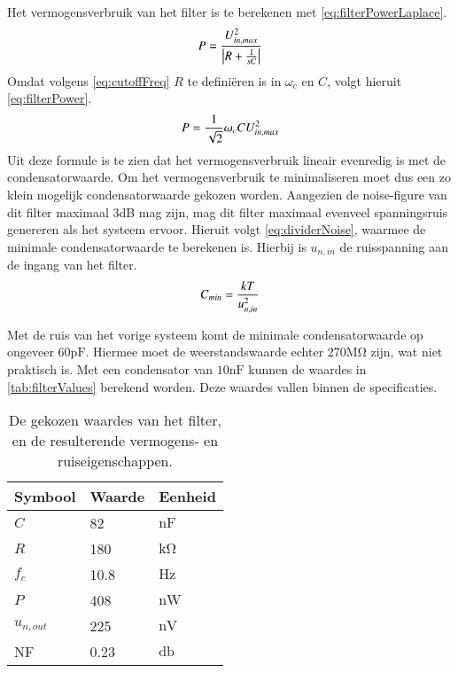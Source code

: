Het vermogensverbruik van het filter is te berekenen met \autoref{eq:filterPowerLaplace}.
\begin{equation} \label{eq:filterPowerLaplace}
    P = \frac{U_{in,max}^2}{\left|R + \frac{1}{sC}\right|}
    \tagaddtext{[\si{\watt}]}
\end{equation}
Omdat volgens \autoref{eq:cutoffFreq} $R$ te definiëren is in $\omega_c$ en $C$, volgt hieruit \autoref{eq:filterPower}.
\begin{equation} \label{eq:filterPower}
    P = \frac{1}{\sqrt{2}}\omega_cCU_{in,max}^2
    \tagaddtext{[\si{\watt}]}
\end{equation}
Uit deze formule is te zien dat het vermogensverbruik lineair evenredig is met de condensatorwaarde. Om het vermogensverbruik te minimaliseren moet dus een zo klein mogelijk condensatorwaarde gekozen worden. Aangezien de noise-figure van dit filter maximaal 3dB mag zijn, mag dit filter maximaal evenveel spanningsruis genereren als het systeem ervoor. Hieruit volgt \autoref{eq:dividerNoise}, waarmee de minimale condensatorwaarde te berekenen is. Hierbij is $u_{n,in}$ de ruisspanning aan de ingang van het filter.
\begin{equation} \label{eq:filterCapMin}
    C_{min} = \frac{kT}{u_{n,in}^2}
    \tagaddtext{[\si{\farad}]}
\end{equation}

Met de ruis van het vorige systeem komt de minimale condensatorwaarde op ongeveer $60\si{\pico\farad}$. Hiermee moet de weerstandswaarde echter $270\si{\mega\ohm}$ zijn, wat niet praktisch is. Met een condensator van $10\si{\nano\farad}$ kunnen de waardes in \autoref{tab:filterValues} berekend worden. Deze waardes vallen binnen de specificaties.

\begin{table}[ht]
    \centering
    \begin{tabular}{l|l|l}
        Symbool & Waarde & Eenheid \\
        \hline
        $C$         & 82    & $\si{\nano\farad}$\\
        $R$         & 180   & $\si{\kilo\ohm}$  \\
        $f_c$       & 10.8  & $\si{\hertz}$     \\
        $P$         & 408   & $\si{\nano\watt}$ \\
        $u_{n,out}$ & 225   & $\si{\nano\volt}$ \\
        NF          & 0.23  & $\si{\decibel}$   \\
    \end{tabular}
    \caption{De gekozen waardes van het filter, en de resulterende vermogens- en ruiseigenschappen.}
    \label{tab:filterValues}
\end{table}